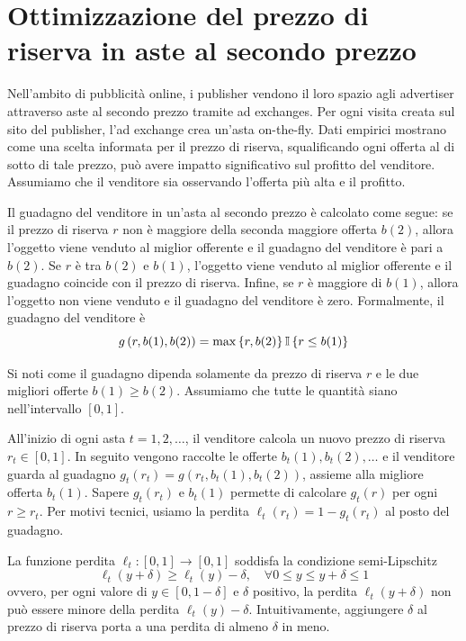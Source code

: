 \section{Ottimizzazione del prezzo di riserva in aste al secondo prezzo}

Nell'ambito di pubblicità online, i publisher vendono il loro spazio agli advertiser attraverso aste al secondo prezzo tramite ad exchanges. Per ogni visita creata sul sito del publisher, l'ad exchange crea un'asta on-the-fly. Dati empirici mostrano come una scelta informata per il prezzo di riserva, squalificando ogni offerta al di sotto di tale prezzo, può avere impatto significativo sul profitto del venditore. Assumiamo che il venditore sia osservando l'offerta più alta e il profitto.

Il guadagno del venditore in un'asta al secondo prezzo è calcolato come segue: se il prezzo di riserva $r$ non è maggiore della seconda maggiore offerta $b(2)$, allora l'oggetto viene venduto al miglior offerente e il guadagno del venditore è pari a $b(2)$. Se $r$ è tra $b(2)$ e $b(1)$, l'oggetto viene venduto al miglior offerente e il guadagno coincide con il prezzo di riserva. Infine, se $r$ è maggiore di $b(1)$, allora l'oggetto non viene venduto e il guadagno del venditore è zero. Formalmente, il guadagno del venditore è 
$$ g\left(r, b(1), b(2)\right) = \max \left\{r, b(2)\right\} \mathbb{I} \left\{r \leq b(1) \right\} $$

Si noti come il guadagno dipenda solamente da prezzo di riserva $r$ e le due migliori offerte $b(1) \geq b(2)$. Assumiamo che tutte le quantità siano nell'intervallo $[0,1]$.

All'inizio di ogni asta $t = 1,2, \dots$, il venditore calcola un nuovo prezzo di riserva $r_t \in [0,1]$. In seguito vengono raccolte le offerte $b_t(1), b_t(2), \dots$ e il venditore guarda al guadagno $g_t (r_t) = g \left(r_t, b_t (1), b_t (2) \right)$, assieme alla migliore offerta $b_t (1)$. Sapere $g_t(r_t)$ e $b_t(1)$ permette di calcolare $g_t(r)$ per ogni $r \geq r_t$. Per motivi tecnici, usiamo la perdita $\ell_t (r_t) = 1 - g_t (r_t)$ al posto del guadagno. 

La funzione perdita $\ell_t : [0,1] \rightarrow [0,1]$ soddisfa la condizione semi-Lipschitz
\[
\ell_t (y + \delta) \geq \ell_t (y) - \delta, \quad \forall 0 \leq y \leq y + \delta \leq 1 \tag*{$(\dag)$}
\]
ovvero, per ogni valore di $y \in [0, 1 - \delta]$ e $\delta$ positivo, la perdita $\ell_t (y + \delta)$ non può essere minore della perdita $\ell_t (y) - \delta$. Intuitivamente, aggiungere $\delta$ al prezzo di riserva porta a una perdita di almeno $\delta$ in meno.

